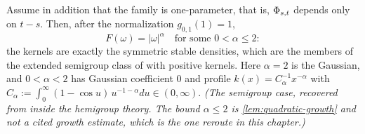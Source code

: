 \begin{corollary}\label{cor:semigroup-case}
\leanok
{}
Assume in addition that the family is one-parameter, that is, $\Phi_{s,t}$ depends only on
$t - s$. Then, after the normalization $g_{0,1}(1) = 1$,
\[
  F(\omega) = |\omega|^\alpha \quad \text{for some } 0 < \alpha \le 2 :
\]
the kernels are exactly the symmetric stable densities, which are the members of the extended
semigroup class of  with positive kernels. Here $\alpha = 2$ is the
Gaussian, and $0 < \alpha < 2$ has Gaussian coefficient $0$ and profile
$k(x) = C_\alpha^{-1}x^{-\alpha}$ with
$C_\alpha := \int_0^\infty (1 - \cos u)\,u^{-1-\alpha}du \in (0,\infty)$.
\statusT\quad\emph{(The semigroup case, recovered from inside the hemigroup theory. The bound
$\alpha \le 2$ is \ref{lem:quadratic-growth} and not a cited growth estimate, which is the one
reroute in this chapter.)}
\end{corollary}

